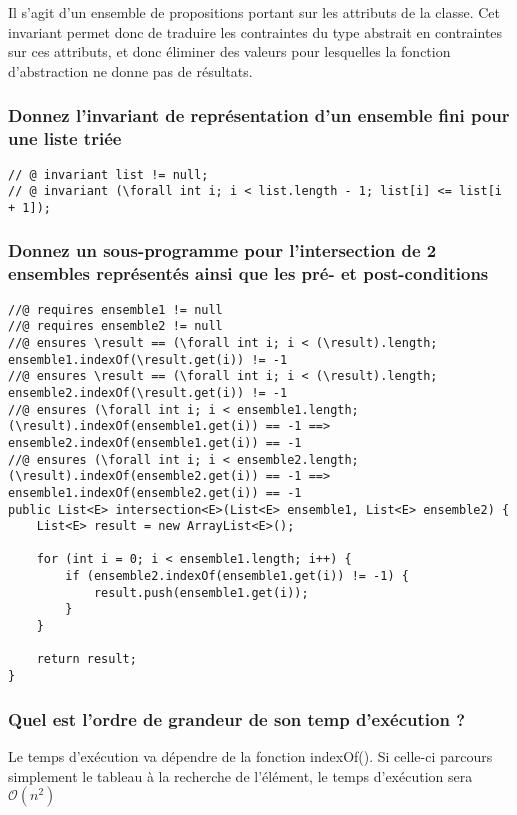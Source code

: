\documentclass[11pt]{article}
\begin{document}
Il s'agit d'un ensemble de propositions portant sur les attributs de la classe. Cet invariant permet donc de traduire les contraintes du type abstrait en contraintes sur ces attributs, et donc éliminer des valeurs pour lesquelles la fonction d’abstraction ne donne pas de résultats.

\subsubsection{Donnez l'invariant de représentation d'un ensemble fini pour une liste triée}

\begin{lstlisting}[]
// @ invariant list != null;
// @ invariant (\forall int i; i < list.length - 1; list[i] <= list[i + 1]);
\end{lstlisting}

\subsubsection{Donnez un sous-programme pour l'intersection de 2 ensembles représentés ainsi que les pré- et post-conditions}

\begin{lstlisting}[]
//@ requires ensemble1 != null
//@ requires ensemble2 != null
//@ ensures \result == (\forall int i; i < (\result).length; ensemble1.indexOf(\result.get(i)) != -1
//@ ensures \result == (\forall int i; i < (\result).length; ensemble2.indexOf(\result.get(i)) != -1
//@ ensures (\forall int i; i < ensemble1.length; (\result).indexOf(ensemble1.get(i)) == -1 ==> ensemble2.indexOf(ensemble1.get(i)) == -1
//@ ensures (\forall int i; i < ensemble2.length; (\result).indexOf(ensemble2.get(i)) == -1 ==> ensemble1.indexOf(ensemble2.get(i)) == -1
public List<E> intersection<E>(List<E> ensemble1, List<E> ensemble2) {
	List<E> result = new ArrayList<E>();
	
	for (int i = 0; i < ensemble1.length; i++) {
		if (ensemble2.indexOf(ensemble1.get(i)) != -1) {
			result.push(ensemble1.get(i));
		}
	}
	
	return result;
}
\end{lstlisting}

\subsubsection{Quel est l'ordre de grandeur de son temp d'exécution ?}

Le temps d'exécution va dépendre de la fonction indexOf(). Si celle-ci parcours simplement le tableau à la recherche de l'élément, le temps d'exécution sera $\mathcal{O}(n^2)$
\end{document}
